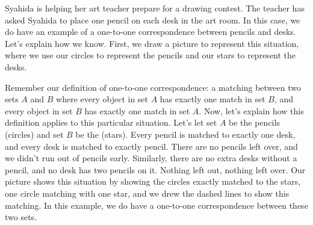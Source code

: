 \documentclass{ximera}
\begin{document}
\begin{example}
Syahida is helping her art teacher prepare for a drawing contest. The teacher has asked Syahida to place one pencil on each desk in the art room. In this case, we do have an example of a one-to-one correspondence between pencils and desks. Let's explain how we know. First, we draw a picture to represent this situation, where we use our circles to represent the pencils and our stars to represent the desks.
\begin{image}
\end{image}
Remember our definition of one-to-one correspondence: a matching between two sets $A$ and $B$ where every object in set $A$ has exactly one match in set $B$, and every object in set $B$ has exactly one match in set $A$. Now, let's explain how this definition applies to this particular situation. Let's let set $A$ be the pencils (circles) and set $B$ be the  (stars). Every pencil is matched to exactly one desk, and every desk is matched to exactly  pencil. There are no pencils left over, and we didn't run out of pencils early. Similarly, there are no extra desks without a pencil, and no desk has two pencils on it. Nothing left out, nothing left over. Our picture shows this situation by showing the circles exactly matched to the stars, one circle matching with one star, and we drew the dashed lines to show this matching. In this example, we do have a one-to-one correspondence between these two sets.

\end{example}
\end{document}
